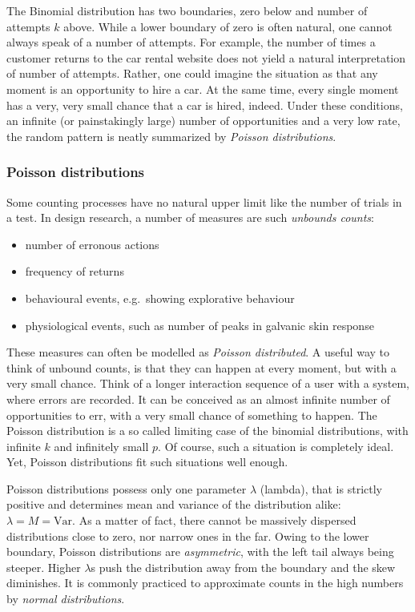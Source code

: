 \documentclass[]{svmono}
\providecommand{\tightlist}{%
  \setlength{\itemsep}{0pt}\setlength{\parskip}{0pt}}
\theoremstyle{definition}
\theoremstyle{definition}
\theoremstyle{definition}
\theoremstyle{remark}
\begin{document}
The Binomial distribution has two boundaries, zero below and number of
attempts \(k\) above. While a lower boundary of zero is often natural,
one cannot always speak of a number of attempts. For example, the number
of times a customer returns to the car rental website does not yield a
natural interpretation of number of attempts. Rather, one could imagine
the situation as that any moment is an opportunity to hire a car. At the
same time, every single moment has a very, very small chance that a car
is hired, indeed. Under these conditions, an infinite (or painstakingly
large) number of opportunities and a very low rate, the random pattern
is neatly summarized by \emph{Poisson distributions}.

\subsubsection{Poisson distributions}\label{poisson_dist}

Some counting processes have no natural upper limit like the number of
trials in a test. In design research, a number of measures are such
\emph{unbounds counts}:

\begin{itemize}
\tightlist
\item
  number of erronous actions
\item
  frequency of returns
\item
  behavioural events, e.g.~showing explorative behaviour
\item
  physiological events, such as number of peaks in galvanic skin
  response
\end{itemize}

These measures can often be modelled as \emph{Poisson distributed}. A
useful way to think of unbound counts, is that they can happen at every
moment, but with a very small chance. Think of a longer interaction
sequence of a user with a system, where errors are recorded. It can be
conceived as an almost infinite number of opportunities to err, with a
very small chance of something to happen. The Poisson distribution is a
so called limiting case of the binomial distributions, with infinite
\(k\) and infinitely small \(p\). Of course, such a situation is
completely ideal. Yet, Poisson distributions fit such situations well
enough.

Poisson distributions possess only one parameter \(\lambda\) (lambda),
that is strictly positive and determines mean and variance of the
distribution alike: \(\lambda = M = \textrm{Var}\). As a matter of fact,
there cannot be massively dispersed distributions close to zero, nor
narrow ones in the far. Owing to the lower boundary, Poisson
distributions are \emph{asymmetric}, with the left tail always being
steeper. Higher \(\lambda\)s push the distribution away from the
boundary and the skew diminishes. It is commonly practiced to
approximate counts in the high numbers by \emph{normal distributions}.
\end{document}
